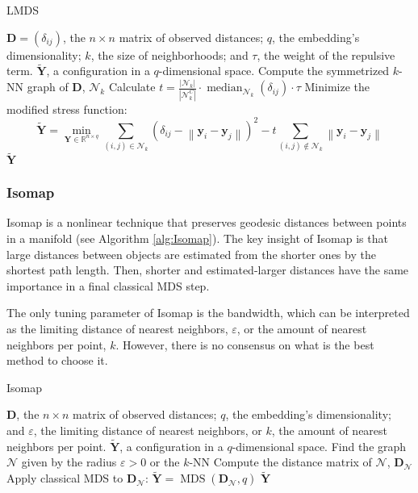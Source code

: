 \begin{algorithm}
    \caption{LMDS}
    \label{alg:LMDS}
    
    \begin{algorithmic}[1]
    \REQUIRE $\mathbf{D} = (\delta_{ij})$, the $n \times n$ matrix of observed distances; $q$, the embedding's dimensionality; $k$, the size of neighborhoods; and $\tau$, the weight of the repulsive term.
    \ENSURE $\mathbf{\tilde{Y}}$, a configuration in a $q$-dimensional space.
    \STATE Compute the symmetrized $k$-NN graph of $\mathbf{D}$, $\mathcal{N}_k$
    \STATE Calculate $t=\frac{|\mathcal{N}_k|}{\left|\mathcal{N}_k^C\right|} \cdot \operatorname{median}_{\mathcal{N}_k}\left(\delta_{ij}\right) \cdot \tau$
    \STATE Minimize the modified stress function:
    $$
    \mathbf{\tilde{Y}} = \min_{\mathbf{Y} \in \mathbb{R}^{n\times q}} \sum_{(i, j) \in \mathcal{N}_k}\left(\delta_{ij}-\left\|\mathbf{y}_i-\mathbf{y}_j\right\|\right)^2 - t \sum_{(i, j) \notin \mathcal{N}_k}\left\|\mathbf{y}_i-\mathbf{y}_j\right\|
    $$
    \RETURN $\mathbf{\tilde{Y}}$
    \end{algorithmic}
\end{algorithm}

\subsubsection{Isomap}

Isomap \citep{Tenenbaum2000} is a nonlinear technique that preserves geodesic distances between points in a manifold (see Algorithm \ref{alg:Isomap}). The key insight of Isomap is that large distances between objects are estimated from the shorter ones by the shortest path length. Then, shorter and estimated-larger distances have the same importance in a final classical MDS step.

The only tuning parameter of Isomap is the bandwidth, which can be interpreted as the limiting distance of nearest neighbors, $\varepsilon$,  or the amount of nearest neighbors per point, $k$. However, there is no consensus on what is the best method to choose it.

\begin{algorithm}
    \caption{Isomap}
    \label{alg:Isomap}

    \begin{algorithmic}[1]
    \REQUIRE $\mathbf{D}$, the $n \times n$ matrix of observed distances; $q$, the embedding's dimensionality; and $\varepsilon$, the limiting distance of nearest neighbors, or $k$, the amount of nearest neighbors per point.
    \ENSURE $\mathbf{\tilde{Y}}$, a configuration in a $q$-dimensional space.
    \STATE Find the graph $\mathcal{N}$ given by the radius $\varepsilon>0$ or the $k$-NN
    \STATE Compute the distance matrix of $\mathcal{N}$, $\mathbf{D}_{\mathcal{N}}$
    \STATE Apply classical MDS to $\mathbf{D}_{\mathcal{N}}$: $\mathbf{\tilde{Y}} = \operatorname{MDS}(\mathbf{D}_{\mathcal{N}}, q)$
    \RETURN $\mathbf{\tilde{Y}}$
    
    \end{algorithmic}
\end{algorithm}

